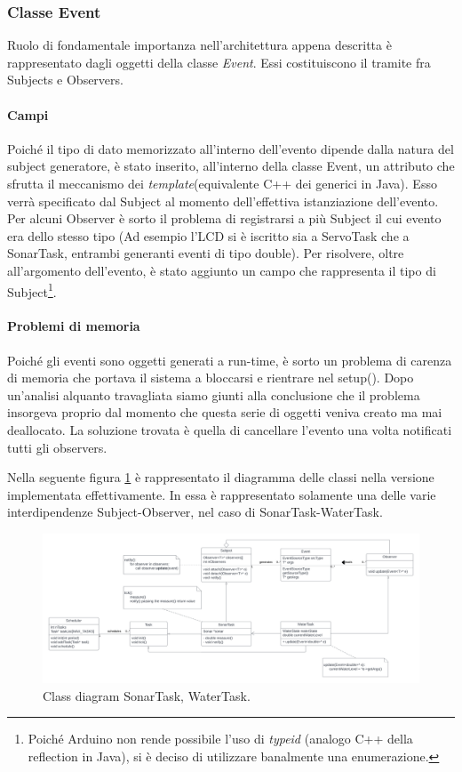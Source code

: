 \documentclass[a4paper,12pt]{report}
\begin{document}
\subsubsection{Classe Event}
Ruolo di fondamentale importanza nell'architettura appena descritta è rappresentato dagli oggetti della classe \emph{Event}. Essi costituiscono il tramite fra Subjects e Observers.
\paragraph{Campi}
Poiché il tipo di dato memorizzato all'interno dell'evento dipende dalla natura del subject generatore, è stato inserito, all'interno della classe Event, un attributo che sfrutta il meccanismo dei \emph{template}(equivalente C++ dei generici in Java). Esso verrà specificato dal Subject al momento dell'effettiva istanziazione dell'evento.
Per alcuni Observer è sorto il problema di registrarsi a più Subject il cui evento era dello stesso tipo (Ad esempio l'LCD si è iscritto sia a ServoTask che a SonarTask, entrambi generanti eventi di tipo double). Per risolvere, oltre all'argomento dell'evento, è stato aggiunto un campo che rappresenta il tipo di Subject\footnote{Poiché Arduino non rende possibile l'uso di \emph{typeid} (analogo C++ della reflection in Java), si è deciso di utilizzare banalmente una enumerazione.}.

\paragraph{Problemi di memoria}
Poiché gli eventi sono oggetti generati a run-time, è sorto un problema di carenza di memoria che portava il sistema a bloccarsi e rientrare nel setup(). Dopo un'analisi alquanto travagliata siamo giunti alla conclusione che il problema insorgeva proprio dal momento che questa serie di oggetti veniva creato ma mai deallocato. La soluzione trovata è quella di cancellare l'evento una volta notificati tutti gli observers.  

Nella seguente figura \ref{fig:classidef} è rappresentato il diagramma delle classi nella versione implementata effettivamente. In essa è rappresentato solamente una delle varie interdipendenze Subject-Observer, nel caso di SonarTask-WaterTask.

\begin{figure}[H]
\centering
\includegraphics[width=1.1\textwidth]{img/Classi - Observer.png}
\caption{Class diagram SonarTask, WaterTask.}
\label{fig:classidef}
\end{figure}
\end{document}
